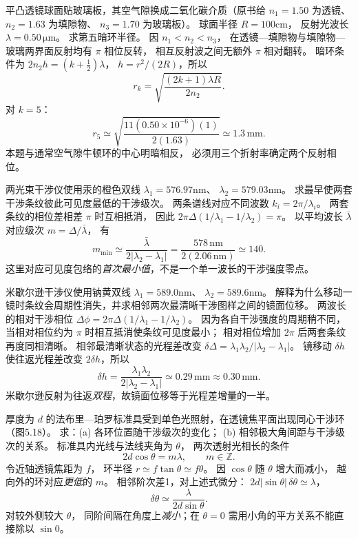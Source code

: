 平凸透镜球面贴玻璃板，其空气隙换成二氧化碳介质（原书给
$n_1=1.50$ 为透镜、
$n_2=1.63$ 为填隙物、
$n_3=1.70$ 为玻璃板）。
球面半径 $R=100$cm，
反射光波长 $\lambda=0.50\,\mathrm{\mu m}$。
求第五暗环半径。
\exsolution
因 $n_1<n_2<n_3$，
在透镜—填隙物与填隙物—玻璃两界面反射均有 $\pi$ 相位反转，
相互反射波之间无额外 $\pi$ 相对翻转。
暗环条件为
$2n_2h=(k+\tfrac12)\lambda$，
$h=r^2/(2R)$，所以
\[
\boxed{r_k=
\sqrt{\frac{(2k+1)\lambda R}{2n_2}}}.
\]
对 $k=5$：
\[
\boxed{r_5\simeq
\sqrt{\frac{11(0.50\times10^{-6})(1)}
{2(1.63)}}
\simeq1.3\,\mathrm{mm}}.
\]
\excheck 本题与通常空气隙牛顿环的中心明暗相反，
必须用三个折射率确定两个反射相位。

两光束干涉仪使用汞的橙色双线
$\lambda_1=576.97$nm、
$\lambda_2=579.03$nm。
求最早使两套干涉条纹彼此可见度最低的干涉级次。
\exsolution
两条谱线对应不同波数
$k_i=2\pi/\lambda_i$。
两套条纹的相位差相差 $\pi$ 时互相抵消，
因此
$2\pi\Delta(1/\lambda_1-1/\lambda_2)=\pi$。
以平均波长 $\bar\lambda$ 对应级次
$m=\Delta/\bar\lambda$，
有
\[
\boxed{m_{\min}\simeq
\frac{\bar\lambda}{2|\lambda_2-\lambda_1|}
=\frac{578\,\mathrm{nm}}{2(2.06\,\mathrm{nm})}
\simeq140}.
\]
\excheck 这里对应可见度包络的\emph{首次最小值}，不是一个单一波长的干涉强度零点。

米歇尔逊干涉仪使用钠黄双线
$\lambda_1=589.0$nm、
$\lambda_2=589.6$nm。
解释为什么移动一镜时条纹会周期性消失，并求相邻两次最清晰干涉图样之间的镜面位移。
\exsolution
两波长的相对干涉相位
$\Delta\phi=2\pi\Delta(1/\lambda_1-1/\lambda_2)$。
因为各自干涉强度的周期稍不同，
当相对相位约为 $\pi$ 时相互抵消使条纹可见度最小；
相对相位增加 $2\pi$ 后两套条纹再度同相清晰。
相邻最清晰状态的光程差改变
$\delta\Delta=\lambda_1\lambda_2/|\lambda_2-\lambda_1|$。
镜移动 $\delta h$ 使往返光程差改变
$2\delta h$，所以
\[
\boxed{\delta h=
\frac{\lambda_1\lambda_2}{2|\lambda_2-\lambda_1|}
\simeq0.29\,\mathrm{mm}\approx0.30\,\mathrm{mm}}.
\]
\excheck 米歇尔逊反射为往返\emph{双程}，故镜面位移等于光程差增量的一半。

厚度为 $d$ 的法布里—珀罗标准具受到单色光照射，在透镜焦平面出现同心干涉环（图5.18）。
求：(a) 各环位置随干涉级次的变化；
(b) 相邻极大角间距与干涉级次的关系。
\exsolution
标准具内光线与法线夹角为 $\theta$，
两次透射光相长的条件
\[
\boxed{2d\cos\theta=m\lambda},\qquad m\in\mathbb Z.
\]
令近轴透镜焦距为 $f$，
环半径 $r\simeq f\tan\theta\simeq f\theta$。
因 $\cos\theta$ 随 $\theta$ 增大而减小，
越向外的环对应\emph{更低}的 $m$。
相邻阶次差1，对上述式微分：
$2d|\sin\theta|\,\delta\theta\simeq\lambda$，
\[
\boxed{\delta\theta\simeq\frac{\lambda}{2d\sin\theta}}.
\]
\excheck 对较外侧较大 $\theta$，
同阶间隔在角度上\emph{减小}；在 $\theta=0$ 需用小角的平方关系不能直接除以 $\sin0$。

